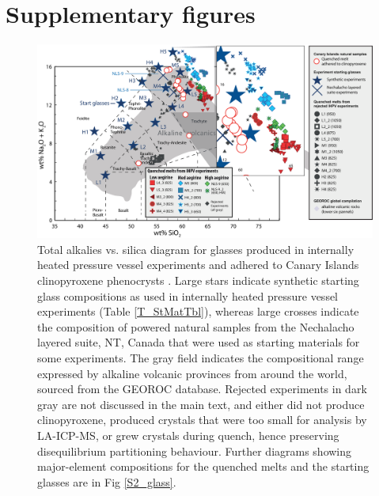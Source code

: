 \documentclass[final,authoryear,3p,times,twocolumn]{elsarticle}
\begin{document}
\section{Supplementary figures}
% 
\begin{figure}[htpb]
\begin{center}
\includegraphics[width=1\textwidth]{S1_TAS_Aug2018.eps}
\caption[Total alkalies vs. silica diagram for glasses produced in the internally heated pressure vessel experiments]{Total alkalies vs. silica diagram for glasses produced in internally heated pressure vessel experiments and adhered to Canary Islands clinopyroxene phenocrysts \citep{LeBas1986TAS}. Large stars indicate synthetic starting glass compositions as used in internally heated pressure vessel experiments (Table \ref{T_StMatTbl}), whereas large crosses indicate the composition of powered natural samples from the Nechalacho layered suite, NT, Canada that were used as starting materials for some experiments. The gray field indicates the compositional range expressed by alkaline volcanic provinces from around the world, sourced from the GEOROC database. Rejected experiments in dark gray are not discussed in the main text, and either did not produce clinopyroxene, produced crystals that were too small for analysis by LA-ICP-MS, or grew crystals during quench, hence preserving disequilibrium partitioning behaviour. Further diagrams showing major-element compositions for the quenched melts and the starting glasses are in Fig \ref{S2_glass}.}
\label{TAS}
\end{center}
\end{figure}
\end{document}
